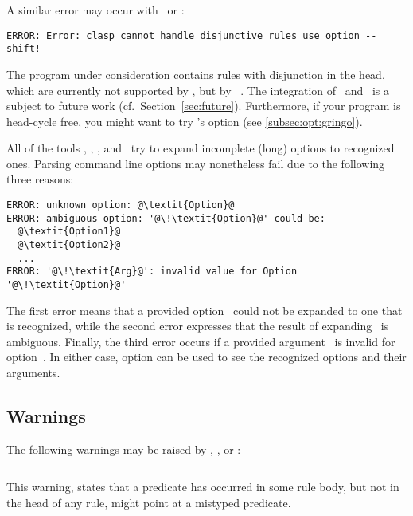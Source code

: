 A similar error may occur with \clingo\ or \iclingo:
%
\begin{lstlisting}[numbers=none,escapechar=@]
ERROR: Error: clasp cannot handle disjunctive rules use option --shift!
\end{lstlisting}
%
The program under consideration contains rules with disjunction in the head,
which are currently not supported by \clasp,
but by \claspD~\cite{drgegrkakoossc08a}.
The integration of \clasp\ and \claspD\ is a subject to future work
(cf.\ Section~\ref{sec:future}).
Furthermore, if your program is head-cycle free, 
you might want to try \gringo's  option (see \ref{subsec:opt:gringo}).

All of the tools \gringo, \clasp, \clingo, and \iclingo\
try to expand incomplete (long) options to recognized ones.
Parsing command line options may nonetheless fail due to the following three reasons:
%
\begin{lstlisting}[numbers=none,escapechar=@]
ERROR: unknown option: @\textit{Option}@
ERROR: ambiguous option: '@\!\textit{Option}@' could be:
  @\textit{Option1}@
  @\textit{Option2}@
  ...
ERROR: '@\!\textit{Arg}@': invalid value for Option '@\!\textit{Option}@'
\end{lstlisting}
%
The first error means that a provided option~
could not be expanded to one that is recognized,
while the second error expresses that the result of expanding~
is ambiguous.
Finally, the third error occurs if a provided argument~
is invalid for option~\code{\textit{Option}}.
In either case, option  can be used to see 
the recognized options and their arguments.


\subsection{Warnings}\label{subsec:warn}

The following warnings may be raised by \gringo, \clingo, or \iclingo:
%
\begin{lstlisting}[numbers=none,escapechar=@]
% warning: @\textit{p}@/@\!\textit{i}@ is never defined
\end{lstlisting}
%
This warning, states that a predicate 
has occurred in some rule body, but not in the head of any rule,
might point at a mistyped predicate.

